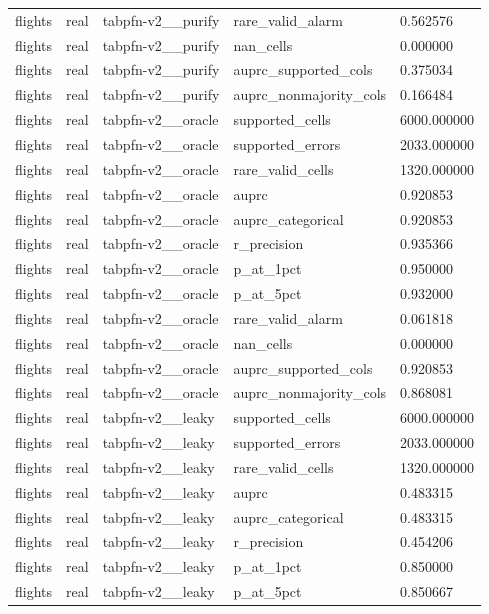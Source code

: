 \begin{tabular}{lllll}
flights & real & tabpfn-v2\_\_purify & rare\_valid\_alarm & 0.562576 \\
flights & real & tabpfn-v2\_\_purify & nan\_cells & 0.000000 \\
flights & real & tabpfn-v2\_\_purify & auprc\_supported\_cols & 0.375034 \\
flights & real & tabpfn-v2\_\_purify & auprc\_nonmajority\_cols & 0.166484 \\
flights & real & tabpfn-v2\_\_oracle & supported\_cells & 6000.000000 \\
flights & real & tabpfn-v2\_\_oracle & supported\_errors & 2033.000000 \\
flights & real & tabpfn-v2\_\_oracle & rare\_valid\_cells & 1320.000000 \\
flights & real & tabpfn-v2\_\_oracle & auprc & 0.920853 \\
flights & real & tabpfn-v2\_\_oracle & auprc\_categorical & 0.920853 \\
flights & real & tabpfn-v2\_\_oracle & r\_precision & 0.935366 \\
flights & real & tabpfn-v2\_\_oracle & p\_at\_1pct & 0.950000 \\
flights & real & tabpfn-v2\_\_oracle & p\_at\_5pct & 0.932000 \\
flights & real & tabpfn-v2\_\_oracle & rare\_valid\_alarm & 0.061818 \\
flights & real & tabpfn-v2\_\_oracle & nan\_cells & 0.000000 \\
flights & real & tabpfn-v2\_\_oracle & auprc\_supported\_cols & 0.920853 \\
flights & real & tabpfn-v2\_\_oracle & auprc\_nonmajority\_cols & 0.868081 \\
flights & real & tabpfn-v2\_\_leaky & supported\_cells & 6000.000000 \\
flights & real & tabpfn-v2\_\_leaky & supported\_errors & 2033.000000 \\
flights & real & tabpfn-v2\_\_leaky & rare\_valid\_cells & 1320.000000 \\
flights & real & tabpfn-v2\_\_leaky & auprc & 0.483315 \\
flights & real & tabpfn-v2\_\_leaky & auprc\_categorical & 0.483315 \\
flights & real & tabpfn-v2\_\_leaky & r\_precision & 0.454206 \\
flights & real & tabpfn-v2\_\_leaky & p\_at\_1pct & 0.850000 \\
flights & real & tabpfn-v2\_\_leaky & p\_at\_5pct & 0.850667 \\

\end{tabular}
